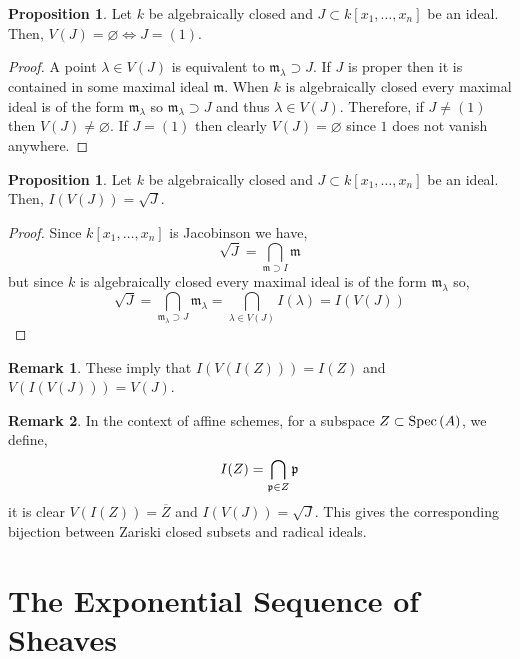 \documentclass[12pt]{extarticle}
\theoremstyle{definition}
\newtheorem{proposition}[theorem]{Proposition}
\newtheorem{remark}{Remark}
\newcommand{\m}{\mathfrak{m}}
\begin{document}
\begin{proposition}
Let $k$ be algebraically closed and $J \subset k[x_1,\dots, x_n]$ be an ideal. Then, $V(J) = \varnothing \iff J = (1)$. 
\end{proposition}

\begin{proof}
A point $\lambda \in V(J)$ is equivalent to $\m_\lambda \supset J$. If $J$ is proper then it is contained in some maximal ideal $\m$. When $k$ is algebraically closed every maximal ideal is of the form $\m_\lambda$ so $\m_\lambda \supset J$ and thus $\lambda \in V(J)$. Therefore, if $J \neq (1)$ then $V(J) \neq \varnothing$. If $J = (1)$ then clearly $V(J) = \varnothing$ since $1$ does not vanish anywhere.
\end{proof}

\begin{proposition}
Let $k$ be algebraically closed and $J \subset k[x_1,\dots, x_n]$ be an ideal. Then, $I(V(J)) = \sqrt{J}$. 
\end{proposition}

\begin{proof}
Since $k[x_1, \dots, x_n]$ is Jacobinson we have,
\[ \sqrt{J} = \bigcap_{\m \supset I} \m \]
but since $k$ is algebraically closed every maximal ideal is of the form $\m_\lambda$ so,
\[ \sqrt{J} = \bigcap_{\m_\lambda \supset J} \m_\lambda = \bigcap_{\lambda \in V(J)} I(\lambda) = I(V(J)) \]
\end{proof}

\begin{remark}
These imply that $I(V(I(Z))) = I(Z)$ and $V(I(V(J))) = V(J)$.
\end{remark}

\begin{remark}
In the context of affine schemes, for a subspace $Z \subset \mathrm{Spec}\left(A\right)$, we define,
\[ I(Z) = \bigcap_{\mathfrak{p} \in Z} \mathfrak{p} \] 
 it is clear $V(I(Z)) = \overline{Z}$ and $I(V(J)) = \sqrt{J}$. This gives the corresponding bijection between Zariski closed subsets and radical ideals.
\end{remark}

\section{The Exponential Sequence of Sheaves}

\newcommand{\Piczero}[1]{\mathrm{Pic}^0\left( #1 \right)}
\end{document}
